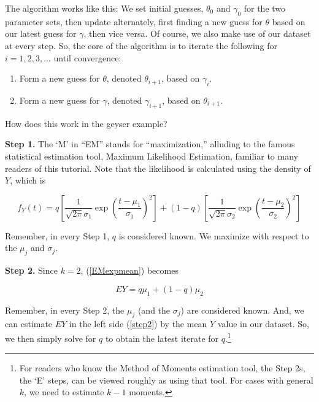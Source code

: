 \documentclass[11pt]{article}
\begin{document}
The algorithm works like this:  We set initial guesses, $\theta_0$ and
$\gamma_0$ for the two parameter sets, then update alternately, first
finding a new guess for $\theta$ based on our latest guess for $\gamma$,
then vice versa.  Of course, we also make use of our dataset at every
step.  So, the core of the algorithm is to iterate the following for
$i=1,2,3,...$ until convergence:

\begin{enumerate}

\item Form a new guess for $\theta$, denoted $\theta_{i+1}$, based
on $\gamma_i$.

\item Form a new guess for $\gamma$, denoted $\gamma_{i+1}$, based
on $\theta_{i+1}$.

\end{enumerate} 

How does this work in the geyser example?  

\textbf{Step 1.}  The `M' in ``EM'' stands for ``maximization,''
alluding to the famous statistical estimation tool, Maximum Likelihood
Estimation, familiar to many readers of this tutorial.  Note that the
likelihood is calculated using the density of $Y$, which is

\begin{equation}
f_Y(t) = 
q \left [ \frac{1}{\sqrt{2\pi} \sigma_1}
\exp \left ( \frac{t-\mu_1}{\sigma_1} \right)^2 \right ] + 
(1-q) \left [ \frac{1}{\sqrt{2\pi} \sigma_2}
\exp \left ( \frac{t-\mu_2}{\sigma_2} \right)^2 \right ]
\end{equation}

Remember, in every Step 1, $q$ is considered known.  We maximize with
respect to the $\mu_j$ and $\sigma_j$.

\textbf{Step 2.}  Since $k=2$, (\ref{EMexpmean}) becomes

\begin{equation}
\label{step2}
EY = q \mu_1 + (1-q) \mu_2
\end{equation}

Remember, in every Step 2, the $\mu_j$ (and the $\sigma_j$) are
considered known.  And, we can estimate $EY$ in the left side
(\ref{step2}) by the mean $Y$ value in our dataset.  So, we then simply
solve for $q$ to obtain the latest iterate for $q$.\footnote{For readers who
know the Method of Moments estimation tool, the Step 2s, the `E' steps,
can be viewed roughly as using that tool.  For cases with general $k$,
we need to estimate $k-1$ moments.}
\end{document}

